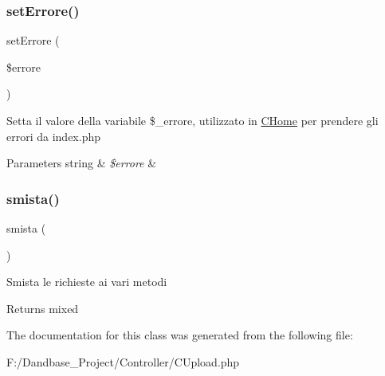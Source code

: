 \subsubsection{\texorpdfstring{set\+Errore()}{setErrore()}}
{\footnotesize\ttfamily set\+Errore (\begin{DoxyParamCaption}\item[{}]{\$errore }\end{DoxyParamCaption})}

Setta il valore della variabile \$\+\_\+errore, utilizzato in \mbox{\hyperlink{class_c_home}{C\+Home}} per prendere gli errori da index.\+php


\begin{DoxyParams}[1]{Parameters}
string & {\em \$errore} & \\
\hline
\end{DoxyParams}
\mbox{\label{class_c_upload_afc7ba180569cef3535974cfc4a1211f1}} 
\subsubsection{\texorpdfstring{smista()}{smista()}}
{\footnotesize\ttfamily smista (\begin{DoxyParamCaption}{ }\end{DoxyParamCaption})}

Smista le richieste ai vari metodi

\begin{DoxyReturn}{Returns}
mixed 
\end{DoxyReturn}


The documentation for this class was generated from the following file\+:\begin{DoxyCompactItemize}
\item 
F\+:/\+Dandbase\+\_\+\+Project/\+Controller/C\+Upload.\+php\end{DoxyCompactItemize}
